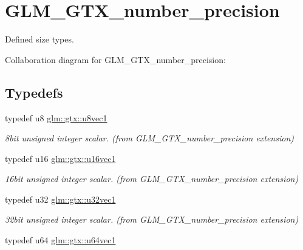 \hypertarget{group__gtx__number__precision}{}\section{G\+L\+M\+\_\+\+G\+T\+X\+\_\+number\+\_\+precision}
\label{group__gtx__number__precision}


Defined size types.  


Collaboration diagram for G\+L\+M\+\_\+\+G\+T\+X\+\_\+number\+\_\+precision\+:
\subsection*{Typedefs}
\begin{DoxyCompactItemize}
\item 
\hypertarget{group__gtx__number__precision_ga35ae7849593a354420e4f52d1b36c2d6}{}typedef u8 \hyperlink{group__gtx__number__precision_ga35ae7849593a354420e4f52d1b36c2d6}{glm\+::gtx\+::u8vec1}\label{group__gtx__number__precision_ga35ae7849593a354420e4f52d1b36c2d6}

\begin{DoxyCompactList}\small\item\em 8bit unsigned integer scalar. (from G\+L\+M\+\_\+\+G\+T\+X\+\_\+number\+\_\+precision extension) \end{DoxyCompactList}\item 
\hypertarget{group__gtx__number__precision_ga807d7e5f24e981b1575bd40ca159781d}{}typedef u16 \hyperlink{group__gtx__number__precision_ga807d7e5f24e981b1575bd40ca159781d}{glm\+::gtx\+::u16vec1}\label{group__gtx__number__precision_ga807d7e5f24e981b1575bd40ca159781d}

\begin{DoxyCompactList}\small\item\em 16bit unsigned integer scalar. (from G\+L\+M\+\_\+\+G\+T\+X\+\_\+number\+\_\+precision extension) \end{DoxyCompactList}\item 
\hypertarget{group__gtx__number__precision_gac46a7890b20928df83e734c3ea9557d4}{}typedef u32 \hyperlink{group__gtx__number__precision_gac46a7890b20928df83e734c3ea9557d4}{glm\+::gtx\+::u32vec1}\label{group__gtx__number__precision_gac46a7890b20928df83e734c3ea9557d4}

\begin{DoxyCompactList}\small\item\em 32bit unsigned integer scalar. (from G\+L\+M\+\_\+\+G\+T\+X\+\_\+number\+\_\+precision extension) \end{DoxyCompactList}\item 
\hypertarget{group__gtx__number__precision_ga92812a1d7e746bcaba61d2f5a64afc52}{}typedef u64 \hyperlink{group__gtx__number__precision_ga92812a1d7e746bcaba61d2f5a64afc52}{glm\+::gtx\+::u64vec1}\label{group__gtx__number__precision_ga92812a1d7e746bcaba61d2f5a64afc52}


\end{DoxyCompactItemize}
